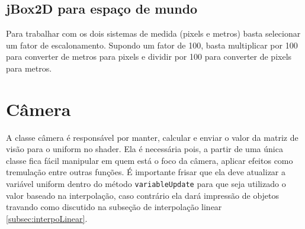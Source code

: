 \documentclass[12pt, 
openright, 
oneside, 
a4paper,    
brazil]{facom-ufu-abntex2}
\begin{document}
\subsection{jBox2D para espaço de mundo}

Para trabalhar com os dois sistemas de medida (pixels e metros) basta selecionar um fator de escalonamento. Supondo um fator de 100, basta multiplicar por 100 para converter de metros para pixels e dividir por 100 para converter de pixels para metros.

\section{Câmera}
A classe câmera é responsável por manter, calcular e enviar o valor da matriz de visão para o uniform no shader. Ela é necessária pois, a partir de uma única classe fica fácil manipular em quem está o foco da câmera, aplicar efeitos como tremulação entre outras funções. É importante frisar que ela deve atualizar a variável uniform dentro do método \texttt{variableUpdate} para que seja utilizado o valor baseado na interpolação, caso contrário ela dará impressão de objetos travando como discutido na subseção de interpolação linear \ref{subsec:interpoLinear}.
\end{document}
